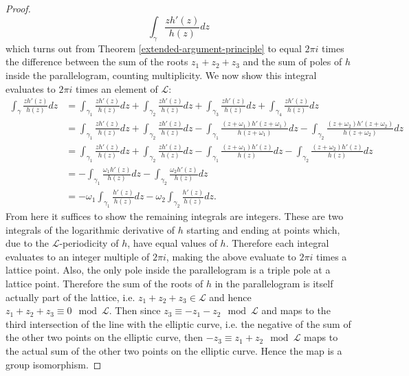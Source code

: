 \documentclass[10pt,a4paper]{amsart}
\begin{document}
\begin{proof}
$$\int_\gamma \frac{zh'(z)}{h(z)}dz$$
which turns out from Theorem \ref{extended-argument-principle} to equal $2\pi i$ times the difference between the sum of the roots $z_1+z_2+z_3$ and the sum of poles of $h$ inside the parallelogram, counting multiplicity. We now show this integral evaluates to $2\pi i$ times an element of $\mathcal{L}$:
{\tiny
\begin{align*}
\int_\gamma \frac{zh'(z)}{h(z)}dz&=\int_{\gamma_1} \frac{zh'(z)}{h(z)}dz+\int_{\gamma_2} \frac{zh'(z)}{h(z)}dz+\int_{\gamma_3} \frac{zh'(z)}{h(z)}dz+\int_{\gamma_4} \frac{zh'(z)}{h(z)}dz\\
&=\int_{\gamma_1} \frac{zh'(z)}{h(z)}dz+\int_{\gamma_2} \frac{zh'(z)}{h(z)}dz-\int_{\gamma_1} \frac{(z+\omega_1)h'(z+\omega_1)}{h(z+\omega_1)}dz-\int_{\gamma_2} \frac{(z+\omega_2)h'(z+\omega_2)}{h(z+\omega_2)}dz\\
&=\int_{\gamma_1} \frac{zh'(z)}{h(z)}dz+\int_{\gamma_2} \frac{zh'(z)}{h(z)}dz-\int_{\gamma_1} \frac{(z+\omega_1)h'(z)}{h(z)}dz-\int_{\gamma_2} \frac{(z+\omega_2)h'(z)}{h(z)}dz\\
&=-\int_{\gamma_1} \frac{\omega_1h'(z)}{h(z)}dz-\int_{\gamma_2} \frac{\omega_2h'(z)}{h(z)}dz\\
&=-\omega_1\int_{\gamma_1} \frac{h'(z)}{h(z)}dz-\omega_2\int_{\gamma_2} \frac{h'(z)}{h(z)}dz.
\end{align*}
}
From here it suffices to show the remaining integrals are integers. These are two integrals of the logarithmic derivative of $h$ starting and ending at points which, due to the $\mathcal L$-periodicity of $h$, have equal values of $h$. Therefore each integral evaluates to an integer multiple of $2\pi i$, making the above evaluate to $2\pi i$ times a lattice point. Also, the only pole inside the parallelogram is a triple pole at a lattice point. Therefore the sum of the roots of $h$ in the parallelogram is itself actually part of the lattice, i.e. $z_1+z_2+z_3\in\mathcal L$ and hence $z_1+z_2+z_3\equiv0\mod\mathcal L$. Then since $z_3\equiv-z_1-z_2\mod\mathcal L$ and maps to the third intersection of the line with the elliptic curve, i.e. the negative of the sum of the other two points on the elliptic curve, then $-z_3\equiv z_1+z_2\mod\mathcal L$ maps to the actual sum of the other two points on the elliptic curve. Hence the map is a group isomorphism.
\end{proof}
\end{document}
